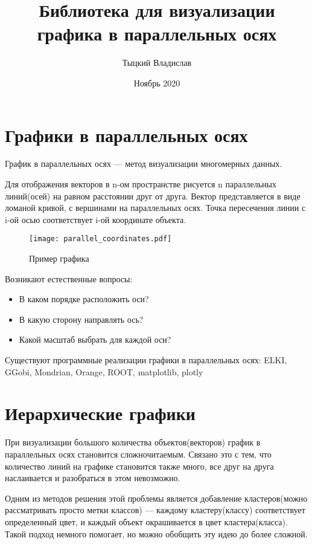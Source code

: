 \documentclass[12pt,fleqn]{article}
\title{Библиотека для визуализации графика в параллельных осях}
\author{Тыцкий Владислав}
\date{Ноябрь 2020}
\begin{document}
\maketitle
\section{Графики в параллельных осях}
График в параллельных осях --- метод визуализации многомерных данных.

Для отображения векторов в n-ом пространстве рисуется n параллельных линий(осей) на равном расстоянии друг 
от друга. Вектор представляется в виде ломаной кривой, с вершинами на параллельных осях. Точка пересечения
линии с i-ой осью соответствует i-ой координате объекта.

\begin{wrapfigure}[7]{r}{0.4\textwidth}
    \texttt{[image: parallel\_coordinates.pdf]} 
    \caption{Пример графика}
    \label{parallel_coords}
\end{wrapfigure}
Возникают естественные вопросы:
\begin{itemize}
    \item В каком порядке расположить оси?
    \item В какую сторону направлять ось?
    \item Какой масштаб выбрать для каждой оси?
\end{itemize}
Существуют программные реализации графики в параллельных осях: ELKI, GGobi, Mondrian,
Orange, ROOT, matplotlib, plotly
\newline

\section{Иерархические графики}
При визуализации большого количества объектов(векторов) график в параллельных осях становится сложночитаемым.
Связано это с тем, что количество линий на графике становится также много, все друг на друга наслаивается и разобраться
в этом невозможно.

Одним из методов решения этой проблемы является добавление кластеров(можно рассматривать просто метки классов) ---
каждому кластеру(классу) соответствует определенный цвет, и каждый объект окрашивается в цвет кластера(класса).
Такой подход немного помогает, но можно обобщить эту идею до более сложной.
\end{document}
